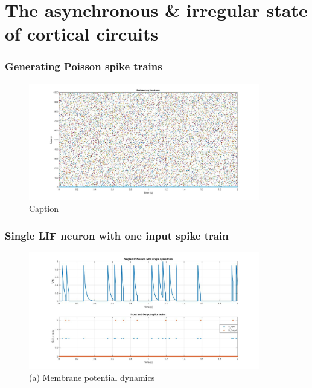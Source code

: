 \documentclass{article}
\begin{document}
\section{The asynchronous \& irregular state of cortical circuits}
\subsubsection{Generating Poisson spike trains}
\begin{figure}[H] 
	\begin{center}
		\includegraphics[width=0.9\textwidth]{Section2/1a.jpg}
		\caption{Caption \label{Q2a_iii_g2}}
	\end{center}
\end{figure}

\subsubsection{Single LIF neuron with one input spike train}

\begin{figure}[H] 
	\begin{center}
		\includegraphics[width=0.9\textwidth]{Section2/2a.jpg}
		\caption{(a) Membrane potential dynamics \label{Q2a_iii_g2}}
	\end{center}
\end{figure}
\end{document}
